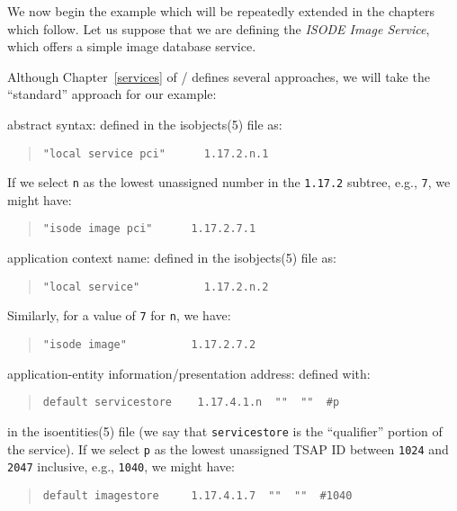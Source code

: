 We now begin the example which will be repeatedly extended in the chapters
which follow.
Let us suppose that we are defining the {\em ISODE Image Service},
which offers a simple image database service.

Although Chapter~\ref{services} of \volone/ defines several approaches,
we will take the ``standard'' approach for our example:
\begin{describe}
\item[abstract syntax:]	defined in the \man isobjects(5) file as:
\begin{quote}\small\begin{verbatim}
"local service pci"      1.17.2.n.1
\end{verbatim}\end{quote}
If we select \verb"n" as the lowest unassigned number in the \verb"1.17.2"
subtree, e.g., \verb"7", we might have:
\begin{quote}\small\begin{verbatim}
"isode image pci"      1.17.2.7.1
\end{verbatim}\end{quote}

\item[application context name:] defined in the \man isobjects(5) file as:
\begin{quote}\small\begin{verbatim}
"local service"          1.17.2.n.2
\end{verbatim}\end{quote}
Similarly, for a value of \verb"7" for \verb"n", we have:
\begin{quote}\small\begin{verbatim}
"isode image"          1.17.2.7.2
\end{verbatim}\end{quote}

\item[{\small application-entity information/presentation address:}]
defined with:
\begin{quote}\small\begin{verbatim}
default servicestore    1.17.4.1.n  ""  ""  #p
\end{verbatim}\end{quote}
in the \man isoentities(5) file
(we say that \verb"servicestore" is the ``qualifier'' portion of the service).
If we select \verb"p" as the lowest unassigned TSAP ID between \verb"1024"
and \verb"2047" inclusive, e.g., \verb"1040", we might have:
\begin{quote}\small\begin{verbatim}
default imagestore     1.17.4.1.7  ""  ""  #1040
\end{verbatim}\end{quote}


\end{describe}
